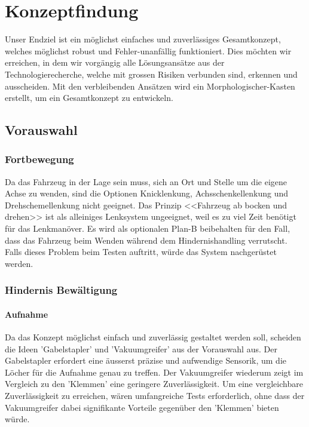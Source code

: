 \newpage
\section{Konzeptfindung}

Unser Endziel ist ein möglichst einfaches und zuverlässiges Gesamtkonzept, welches möglichst robust und Fehler-unanfällig funktioniert. Dies möchten wir erreichen, in dem wir vorgängig alle Lösungsansätze aus der Technologierecherche, welche mit grossen Risiken verbunden sind, erkennen und ausscheiden. Mit den verbleibenden Ansätzen wird ein Morphologischer-Kasten erstellt, um ein Gesamtkonzept zu entwickeln.

\subsection{Vorauswahl}
    \subsubsection{Fortbewegung}
        Da das Fahrzeug in der Lage sein muss, sich an Ort und Stelle um die eigene Achse zu wenden, sind die Optionen Knicklenkung, Achsschenkellenkung und Drehschemellenkung nicht geeignet.
        Das Prinzip <<Fahrzeug ab bocken und drehen>> ist als alleiniges Lenksystem ungeeignet, weil es zu viel Zeit benötigt für das Lenkmanöver. Es wird als optionalen Plan-B beibehalten für den Fall, dass das Fahrzeug beim Wenden während dem Hindernishandling verrutscht. Falls dieses Problem beim Testen auftritt, würde das System nachgerüstet werden.
    \newpage
    \subsubsection{Hindernis Bewältigung}
        \paragraph{Aufnahme}
            Da das Konzept möglichst einfach und zuverlässig gestaltet werden soll, scheiden die Ideen 'Gabelstapler' und 'Vakuumgreifer' aus der Vorauswahl aus. Der Gabelstapler erfordert eine äusserst präzise und aufwendige Sensorik, um die Löcher für die Aufnahme genau zu treffen. Der Vakuumgreifer wiederum zeigt im Vergleich zu den 'Klemmen' eine geringere Zuverlässigkeit. Um eine vergleichbare Zuverlässigkeit zu erreichen, wären umfangreiche Tests erforderlich, ohne dass der Vakuumgreifer dabei signifikante Vorteile gegenüber den 'Klemmen' bieten würde.

